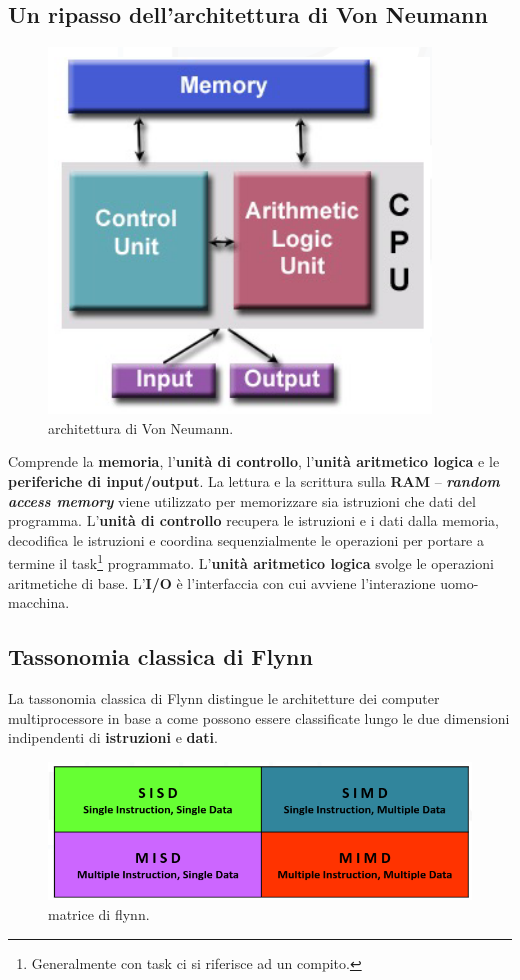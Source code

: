 \subsection*{Un ripasso dell'architettura di Von Neumann}

\begin{figure}
	\centering
	\includegraphics[width=.7\linewidth]{img/von-neumann}
	\caption{architettura di Von Neumann.}
	\label{fig:von-neumann}
\end{figure} 
Comprende la \textbf{memoria}, l'\textbf{unità di controllo}, l'\textbf{unità aritmetico logica} e le \textbf{periferiche di input/output}. La lettura e la scrittura sulla \textbf{RAM} -- \textbf{\textit{random access memory}} viene utilizzato per memorizzare sia istruzioni che dati del programma. L'\textbf{unità di controllo} recupera le istruzioni e i dati dalla memoria, decodifica le istruzioni e coordina sequenzialmente le operazioni per portare a termine il task\footnote{Generalmente con task ci si riferisce ad un compito.} programmato. L'\textbf{unità aritmetico logica} svolge le operazioni aritmetiche di base. L'\textbf{I/O} è l'interfaccia con cui avviene l'interazione uomo-macchina.

\subsection{Tassonomia classica di Flynn}
La tassonomia classica di Flynn distingue le architetture dei computer multiprocessore in base a come possono essere classificate lungo le due dimensioni indipendenti di \textbf{istruzioni} e \textbf{dati}.
\begin{figure}[th]
	\centering
	\includegraphics[width=0.7\linewidth]{img/flynn}
	\caption{matrice di flynn.}
	\label{fig:flynn}
\end{figure}

